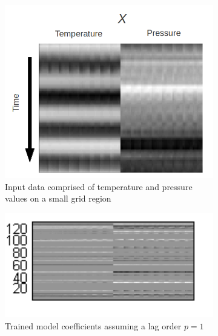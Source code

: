 \documentclass{article} %
\newcommand{\VARlag}{p}
\begin{document}
\begin{figure}[t]
\centering
\begin{subfigure}[b]{0.4\textwidth}
	\includegraphics[width=1.0\textwidth]{./var_data_example.png}
	\caption{Input data comprised of temperature and pressure values on a small grid region}
\end{subfigure}
\hspace{0.05\textwidth}
\begin{subfigure}[b]{0.2\textwidth}
	\includegraphics[width=1.0\textwidth]{./var_params_lag_1.png}
	\caption{Trained model coefficients assuming a lag order $\VARlag = 1$}
\end{subfigure}
\hspace{0.05\textwidth}
\begin{subfigure}[b]{0.2\textwidth}

\end{subfigure}
\end{figure}
\end{document}
